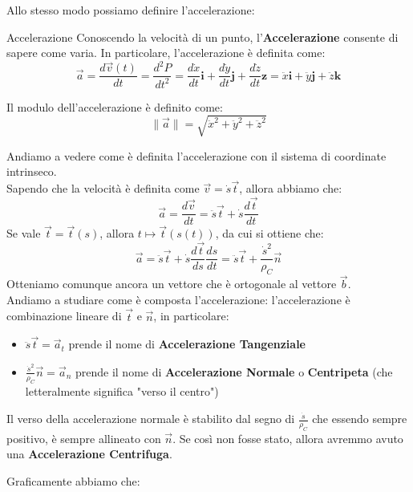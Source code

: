 \documentclass[11pt,a4paper,twoside]{article}
\theoremstyle{definition}
\begin{document}
Allo stesso modo possiamo definire l'accelerazione:

\begin{defn}{Accelerazione}{}
	Conoscendo la velocità di un punto, l'\textbf{Accelerazione} consente di sapere come varia. In particolare, l'accelerazione è definita come:
	\[\vec a = \frac{d \vec v(t)}{dt} = \frac{d^2P}{dt^2} = \frac{d \dot x}{dt} \mathbf i + \frac{d \dot y}{dt} \mathbf j + \frac{d \dot z}{dt} \mathbf z = \ddot x \mathbf i + \ddot y \mathbf j + \ddot z \mathbf k\]
\end{defn}

Il modulo dell'accelerazione è definito come:
\[\|\vec a\| = \sqrt{\ddot x^2 + \ddot y^2 + \ddot z^2}\]

Andiamo a vedere come è definita l'accelerazione con il sistema di coordinate intrinseco.\\
Sapendo che la velocità è definita come $\vec v = \dot s \vec t$, allora abbiamo che:
\[\vec a = \frac{d \vec v}{dt} = \ddot s \vec t + \dot s \frac{d\vec t}{dt}\]
Se vale $\vec t = \vec t(s)$, allora $t \mapsto \vec t(s(t))$, da cui si ottiene che:
\[\vec a = \ddot s \vec t + \dot s \frac{d \vec t}{ds}\frac{ds}{dt} = \ddot s \vec t + \frac{\dot s^2}{\rho_C} \vec n\]
Otteniamo comunque ancora un vettore che è ortogonale al vettore $\vec b$.\\
Andiamo a studiare come è composta l'accelerazione: l'accelerazione è combinazione lineare di $\vec t$ e $\vec n$, in particolare:
\begin{itemize}
	\item $\ddot s \vec t = \vec a_t$ prende il nome di \textbf{Accelerazione Tangenziale}
	\item $\frac{\dot s^2}{\rho_C} \vec n = \vec a_n$ prende il nome di \textbf{Accelerazione Normale} o \textbf{Centripeta} (che letteralmente significa "verso il centro")
\end{itemize}

Il verso della accelerazione normale è stabilito dal segno di $\frac{\dot s}{\rho_C}$ che essendo sempre positivo, è sempre allineato con $\vec n$. Se così non fosse stato, allora avremmo avuto una \textbf{Accelerazione Centrifuga}.

Graficamente abbiamo che:

\begin{center}
\end{center}
\end{document}
